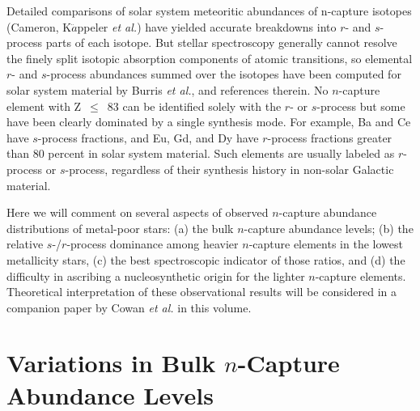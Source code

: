 \documentclass{ws-p8-50x6-00}
\begin{document}
Detailed comparisons of solar system meteoritic abundances of n-capture 
isotopes (Cameron\cite{Ca82}, K$\ddot{a}$ppeler {\it et al.}\cite{Ka89}) 
have yielded 
accurate breakdowns into $r$- and $s$-process parts of each isotope.  
But stellar spectroscopy generally cannot resolve the finely split isotopic
absorption components of atomic transitions, so elemental $r$- and
$s$-process abundances summed over the isotopes have been computed 
for solar system material by Burris {\it et al.}\cite{Bu00},
and references therein.  
No $n$-capture element with Z~$\leq$~83 can be identified solely
with the $r$- or $s$-process but some have been clearly dominated by a 
single synthesis mode.  
For example, Ba and Ce have $s$-process fractions, and Eu, Gd, and Dy have
$r$-process fractions greater than 80 percent  in solar system material.
Such elements are usually labeled as $r$-process or $s$-process,
regardless of their synthesis history in non-solar Galactic material.
 
Here we will comment on several aspects of observed 
$n$-capture abundance distributions of metal-poor stars: 
(a) the bulk $n$-capture abundance levels; (b) the relative $s$-/$r$-process 
dominance among heavier $n$-capture elements in the lowest metallicity 
stars, (c) the best spectroscopic indicator of those ratios, and (d) the
difficulty in ascribing a nucleosynthetic origin for the lighter 
$n$-capture elements.  
Theoretical interpretation of these observational results will be 
considered in a companion paper by Cowan {\it et al.} in this volume.






\section{Variations in Bulk $n$-Capture Abundance Levels}
\end{document}
